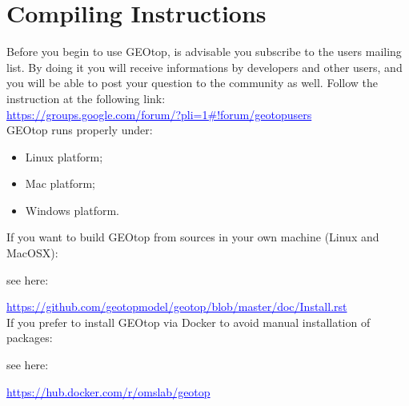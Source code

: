 \chapter{Compiling Instructions}\label{chap:User Manual}

\noindent Before you begin to use GEOtop, is advisable you subscribe to the
users mailing list. By doing it you will receive informations by developers and
other users, and you will be able to post your question to the community as
well. Follow the instruction at the following link:\\

\textcolor{blue}{\underline{{https://groups.google.com/forum/?pli=1\#!forum/geotopusers}}}\\


\noindent GEOtop runs properly under:
\begin{itemize}
 \item Linux platform;
 \item Mac platform;
 \item Windows platform.
\end{itemize}


If you want to build GEOtop from sources in your own machine (Linux and MacOSX):

see here: 

\textcolor{blue}{\underline{{https://github.com/geotopmodel/geotop/blob/master/doc/Install.rst}}}\\

If you prefer to install GEOtop via Docker to avoid manual installation of packages:

see here: 

\textcolor{blue}{\underline{{https://hub.docker.com/r/omslab/geotop}}}\\





